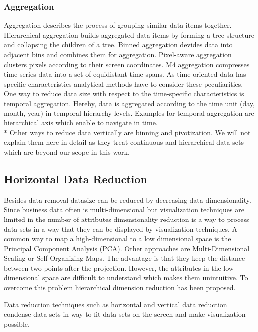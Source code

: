 \subsubsection*{Aggregation}
Aggregation describes the process of grouping similar data items together. Hierarchical aggregation builds aggregated data items by forming a tree structure and collapsing the children of a tree\cite{elmqvist2010hierarchical}. Binned aggregation devides data into adjacent bins and combines them for aggregation\cite{Liu2013}. Pixel-aware aggregation clusters pixels according to their screen coordinates\cite{li2016polyspector}. M4 aggregation compresses time series data into a set of equidistant time spans\cite{jugel2014m4}.
As time-oriented data has specific characteristics analytical methods have to consider these peculiarities. One way to reduce data size with respect to the time-specific characteristics is temporal aggregation. Hereby, data is aggregated according to the time unit (day, month, year) in temporal hierarchy levels. Examples for temporal aggregation are hierarchical axis \cite{Chung2014} which enable to navigate in time. 
\\*
Other ways to reduce data vertically are binning and pivotization. We will not explain them here in detail as they treat continuous and hierarchical data sets which are beyond our scope in this work. 

\subsection{Horizontal Data Reduction}
Besides data removal datasize can be reduced by decreasing data dimensionality. Since business data often is multi-dimensional but visualization techniques are limited in the number of attributes dimensionality reduction is a way to process data sets in a way that they can be displayed by visualization techniques. 
A common way to map a high-dimensional to a low dimensional space is the Principal Component Analysis (PCA)\cite{Aigner2008}. Other approaches are Multi-Dimensional Scaling or Self-Organizing Maps\cite{PiringerHarald2011}. The advantage is that they keep the distance between two points after the projection. However, the attributes in the low-dimensional space are difficult to understand which makes them unintuitive. To overcome this problem hierarchical dimension reduction has been proposed. 

Data reduction techniques such as horizontal and vertical data reduction condense  data sets in way to fit data sets on the screen and  make visualization possible. 



